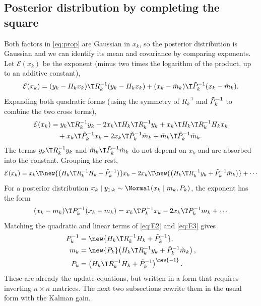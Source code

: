 \subsection{Posterior distribution by completing the square}
Both factors in \eqref{eq:prop} are Gaussian in $x_k$, so the posterior distribution is Gaussian and we can identify its mean and covariance by comparing exponents. Let $\mathcal{E}(x_k)$ be the exponent (minus two times the logarithm of the product, up to an additive constant),
\begin{equation}
  \mathcal{E}(x_k) = (y_k - H_k x_k)\T R_k^{-1}(y_k - H_k x_k) + (x_k - \mt_k)\T \Pt_k^{-1}(x_k - \mt_k). \label{eq:E}
\end{equation}
Expanding both quadratic forms (using the symmetry of $R_k^{-1}$ and $\tilde P_k^{-1}$ to combine the two cross terms),
\begin{equation}
  \begin{aligned}
  \mathcal{E}(x_k) &= y_k\T R_k^{-1}y_k - 2x_k\T H_k\T R_k^{-1}y_k + x_k\T H_k\T R_k^{-1}H_k x_k \\
  &\quad + x_k\T \Pt_k^{-1}x_k - 2x_k\T \Pt_k^{-1}\mt_k + \mt_k\T \Pt_k^{-1}\mt_k.
  \end{aligned}
\end{equation}
The terms $y_k\T R_k^{-1}y_k$ and $\mt_k\T \Pt_k^{-1}\mt_k$ do not depend on $x_k$ and are absorbed into the constant. Grouping the rest,
\begin{equation}
  \mathcal{E}(x_k) = x_k\T\!\new{\left(H_k\T R_k^{-1}H_k + \Pt_k^{-1}\right)}x_k - 2x_k\T\!\new{\left(H_k\T R_k^{-1}y_k + \Pt_k^{-1}\mt_k\right)} + \cdots \label{eq:E2}
\end{equation}
For a posterior distribution $x_k \mid y_{1:k} \sim \Normal(x_k \mid m_k, P_k)$, the exponent has the form
\begin{equation}
  (x_k - m_k)\T P_k^{-1}(x_k - m_k) = x_k\T P_k^{-1}x_k - 2x_k\T P_k^{-1}m_k + \cdots \label{eq:E3}
\end{equation}
Matching the quadratic and linear terms of \eqref{eq:E2} and \eqref{eq:E3} gives
\begin{align}
  P_k^{-1} &= \new{H_k\T R_k^{-1}H_k + \Pt_k^{-1}}, \\
  m_k &= \new{P_k}\!\left(H_k\T R_k^{-1}y_k + \Pt_k^{-1}\mt_k\right), \label{eq:m39}\\
  P_k &= \left(H_k\T R_k^{-1}H_k + \Pt_k^{-1}\right)^{\new{-1}}. \label{eq:P40}
\end{align}
These are already the update equations, but written in a form that requires inverting $n\times n$ matrices. The next two subsections rewrite them in the usual form with the Kalman gain.

